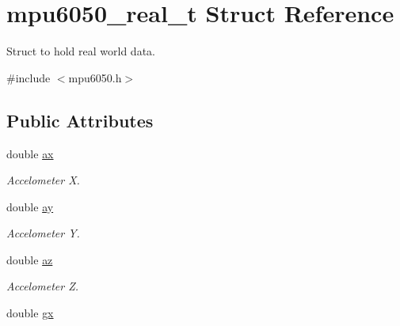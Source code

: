 \hypertarget{structmpu6050__real__t}{}\section{mpu6050\+\_\+real\+\_\+t Struct Reference}
\label{structmpu6050__real__t}


Struct to hold real world data.  




{\ttfamily \#include $<$mpu6050.\+h$>$}

\subsection*{Public Attributes}
\begin{DoxyCompactItemize}
\item 
\hypertarget{structmpu6050__real__t_a0b387984e27c89f1730e82b617118585}{}double \hyperlink{structmpu6050__real__t_a0b387984e27c89f1730e82b617118585}{ax}\label{structmpu6050__real__t_a0b387984e27c89f1730e82b617118585}

\begin{DoxyCompactList}\small\item\em Accelometer X. \end{DoxyCompactList}\item 
\hypertarget{structmpu6050__real__t_a3fab6a2df481f4878417fa1229d60ce1}{}double \hyperlink{structmpu6050__real__t_a3fab6a2df481f4878417fa1229d60ce1}{ay}\label{structmpu6050__real__t_a3fab6a2df481f4878417fa1229d60ce1}

\begin{DoxyCompactList}\small\item\em Accelometer Y. \end{DoxyCompactList}\item 
\hypertarget{structmpu6050__real__t_adb63793cc37efa60e15fa542c3c7cbb8}{}double \hyperlink{structmpu6050__real__t_adb63793cc37efa60e15fa542c3c7cbb8}{az}\label{structmpu6050__real__t_adb63793cc37efa60e15fa542c3c7cbb8}

\begin{DoxyCompactList}\small\item\em Accelometer Z. \end{DoxyCompactList}\item 
\hypertarget{structmpu6050__real__t_a109aaca6cd7b09b2a213f44de65c3bb8}{}double \hyperlink{structmpu6050__real__t_a109aaca6cd7b09b2a213f44de65c3bb8}{gx}\label{structmpu6050__real__t_a109aaca6cd7b09b2a213f44de65c3bb8}


\end{DoxyCompactItemize}
